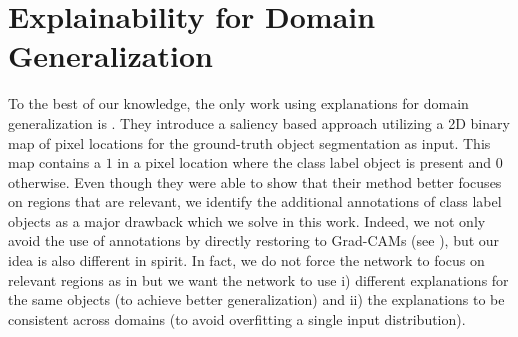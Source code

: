 \section{Explainability for Domain Generalization}

To the best of our knowledge, the only work using explanations for domain generalization is \citet{zunino2020explainable}.
They introduce a saliency based approach utilizing a 2D binary map of pixel locations for the ground-truth object segmentation as input. This map contains a $1$ in a pixel location where the class label object is present and $0$ otherwise. Even though they were able to show that their method better focuses on regions that are relevant, we identify the additional annotations of class label objects as a major drawback which we solve in this work. Indeed, we not only avoid the use of annotations by directly restoring to Grad-CAMs (see ), but our idea is also different in spirit. In fact, we do not force the network to focus on relevant regions as in \cite{zunino2020explainable} but we want the network to use i) different explanations for the same objects (to achieve better generalization) and ii) the explanations to be consistent across domains (to avoid overfitting a single input distribution).